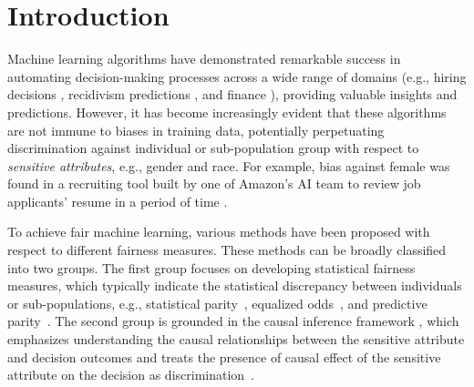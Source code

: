 \documentclass{article} %
\begin{document}
\section{Introduction} \label{sec: Introduction}

Machine learning algorithms have demonstrated remarkable success in automating decision-making processes across a wide range of domains (e.g., hiring decisions \citep{hoffman2018discretion}, recidivism predictions \citep{dieterich2016compas, brennan2009evaluating},  and finance \citep{sweeney2013discrimination, khandani2010consumer}), providing valuable insights and predictions. However, it has become increasingly evident that these algorithms are not immune to biases in training data, potentially perpetuating discrimination against individual or sub-population group with respect to \textit{sensitive attributes}, e.g., gender and race. For example, bias against female was found in a recruiting tool built by one of Amazon's AI team to review job applicants' resume in a period of time \citep{kodiyan2019overview}. 

To achieve fair machine learning, various methods have been proposed with respect to different fairness measures. These methods can be broadly classified into two groups. The first group focuses on developing statistical fairness measures, which typically indicate the statistical discrepancy between individuals or sub-populations, e.g., statistical parity~\citep{dwork2012fairness}, equalized odds~\citep{hardt2016equality}, and predictive parity~\citep{chouldechova2017fair}. 
The second group is grounded in the causal inference framework \citep{pearl2000models}, which emphasizes understanding the causal relationships between the sensitive attribute and decision outcomes and treats the presence of causal effect of the sensitive attribute on the decision as discrimination~\citep{zhang2017causal,kilbertus2017avoiding, kusner2017counterfactual, zhang2018fairness, zhang2018equality,nabi2018fair,wu2019pc,khademi2019fairness,chiappa2019path, russell2017worlds, zhang2018causal, zhang2017anti, kusner2019making, salimi2019interventional, wu2018discrimination, galhotra2022causal, zuo2022counterfactual}. 
\end{document}
